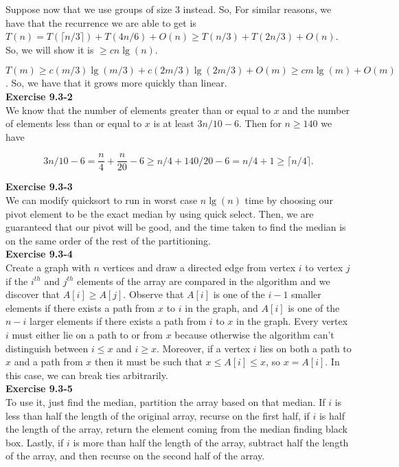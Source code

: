 \documentclass{article}
\begin{document}
Suppose now that we use groups of size $3$ instead. So, For similar reasons, we have that the recurrence we are able to get is $T(n) = T(\lceil n/3 \rceil) + T(4n/6) + O(n) \ge T(n/3)+ T(2n/3) +O(n)$. So, we will show it is $\ge cn\lg(n)$.

$T(m) \ge c (m/3)\lg(m/3) + c(2m/3) \lg(2m/3) +O(m) \ge  c m \lg(m) +O(m)$. So, we have that it grows more quickly than linear.\\

\noindent\textbf{Exercise 9.3-2}\\

We know that the number of elements greater than or equal to $x$ and the number of elements less than or equal to $x$ is at least $3n/10 - 6$.  Then for $n\geq 140$ we have

\[3n/10-6 = \frac{n}{4} + \frac{n}{20} - 6 \geq n/4 + 140/20 - 6 = n/4 + 1 \geq \lceil n/4\rceil.\]

\noindent\textbf{ Exercise 9.3-3} \\
We can modify quicksort to run in worst case $n\lg(n)$ time by choosing our pivot element to be the exact median by using quick select. Then, we are guaranteed that our pivot will be good, and the time taken to find the median is on the same order of the rest of the partitioning.\\

\noindent\textbf{Exercise 9.3-4}\\

Create a graph with $n$ vertices and draw a directed edge from vertex $i$ to vertex $j$ if the $i^{th}$ and $j^{th}$ elements of the array are compared in the algorithm and we discover that $A[i] \geq A[j]$.  Observe that $A[i]$ is one of the $i-1$ smaller elements if there exists a path from $x$ to $i$ in the graph, and $A[i]$ is one of the $n-i$ larger elements if there exists a path from $i$ to $x$ in the graph.  Every vertex $i$ must either lie on a path to or from $x$ because otherwise the algorithm can't distinguish between $i \leq x$ and $i \geq x$.  Moreover, if a vertex $i$ lies on both a path to $x$ and a path from $x$ then it must be such that $x \leq A[i] \leq x$, so $x = A[i]$. In this case, we can break ties arbitrarily. \\


\noindent\textbf{ Exercise 9.3-5} \\
To use it, just find the median, partition the array based on that median. If $i$ is less than half the length of the original array, recurse on the first half, if $i$ is half the length of the array, return the element coming from the median finding black box. Lastly, if $i$ is more than half the length of the array, subtract half the length of the array, and then recurse on the second half of the array.\\
\end{document}
